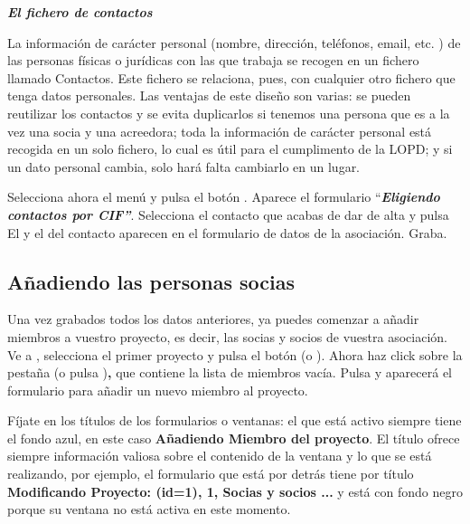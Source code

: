 \begin{center}
\begin{minipage}{8.1cm}
{\centering\bfseries\itshape
\label{ref:elficherodecontactos}El fichero de contactos
\par}

La información de carácter personal (nombre, dirección,
teléfonos, email, etc. ) de las personas físicas o jurídicas con
las que trabaja \appname se recogen en un fichero llamado
{\textquotesingle}Contactos{\textquotesingle}. Este fichero se
relaciona, pues, con cualquier otro fichero que tenga datos personales.
Las ventajas de este diseño son varias: se pueden reutilizar los
contactos y se evita duplicarlos si tenemos una persona que es a la vez
una socia y una acreedora; toda la información de carácter personal
está recogida en un solo fichero, lo cual es útil para el
cumplimento de la LOPD; y si un dato personal cambia, solo hará falta
cambiarlo en un lugar.
\end{minipage}
\end{center}
Selecciona ahora el menú  y pulsa el botón
. Aparece el formulario
{\textquotedblleft}\textbf{\textit{Eligiendo contactos por
CIF{\textquotedblright}}}. Selecciona el contacto que acabas de dar de
alta y pulsa  El 
y el  del contacto aparecen en el
formulario de datos de la asociación. Graba.

\subsection{Añadiendo las personas socias }
Una vez grabados todos los datos anteriores, ya puedes comenzar a
añadir miembros a vuestro proyecto, es decir, las socias y socios de
vuestra asociación. Ve a
, selecciona el primer proyecto y pulsa el botón
 (o
). Ahora haz click sobre la pestaña
 (o pulsa
)\textbf{,} que contiene la lista de
miembros vacía. Pulsa  y aparecerá el
formulario para añadir un nuevo miembro al proyecto.

Fíjate en los títulos de los formularios o ventanas: el que está
activo siempre tiene el fondo azul, en este caso
{\textquotesingle}\textbf{Añadiendo Miembro del
proyecto}{\textquotesingle}. El título ofrece siempre información
valiosa sobre el contenido de la ventana y lo que se está realizando,
por ejemplo, el formulario que está por detrás tiene por título
{\textquotesingle}\textbf{Modificando Proyecto: (id=1), 1, Socias y
socios ...}{\textquotesingle} y está con fondo negro porque su
ventana no está activa en este momento. 


